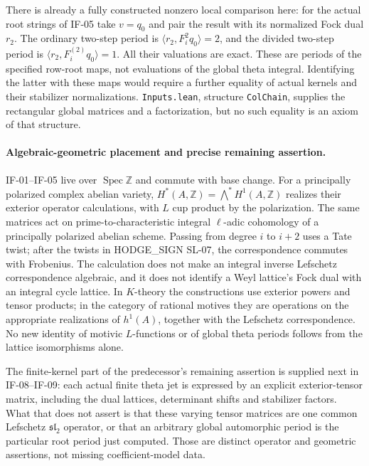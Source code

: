 \documentclass[11pt,a4paper]{article}
\theoremstyle{definition}
\theoremstyle{remark}
\begin{document}
There is already a fully constructed nonzero local comparison here:
for the actual root strings of IF-05 take $v=q_0$ and pair the result
with its normalized Fock dual $r_2$. The ordinary two-step period is
$\langle r_2,F_i^2q_0\rangle=2$, and the divided two-step period is
$\langle r_2,F_i^{(2)}q_0\rangle=1$. All their valuations are exact.
These are periods of the specified row-root maps, not evaluations of
the global theta integral. Identifying the latter with these maps
would require a further equality of actual kernels and their
stabilizer normalizations. \texttt{Inputs.lean}, structure
\texttt{ColChain}, supplies the rectangular global matrices and a
factorization, but no such equality is an axiom of that structure.

\paragraph{Algebraic-geometric placement and precise remaining assertion.}
IF-01--IF-05 live over $\operatorname{Spec}\mathbb Z$ and commute with
base change. For a principally polarized complex abelian variety,
$H^*(A,\mathbb Z)=\bigwedge^*H^1(A,\mathbb Z)$ realizes their exterior
operator calculations, with $L$ cup product by the polarization.
The same matrices act on prime-to-characteristic integral
$\ell$-adic cohomology of a principally polarized abelian scheme.
Passing from degree $i$ to $i+2$ uses a Tate twist; after the twists in
HODGE\_SIGN SL-07, the correspondence commutes with Frobenius. The
calculation does not make an integral inverse Lefschetz correspondence
algebraic, and it does not identify a Weyl lattice's Fock dual with an
integral cycle lattice. In $K$-theory the constructions use exterior
powers and tensor products; in the category of rational motives they
are operations on the appropriate realizations of $h^1(A)$, together
with the Lefschetz correspondence. No new identity of motivic
$L$-functions or of global theta periods follows from the lattice
isomorphisms alone.

The finite-kernel part of the predecessor's remaining assertion is
supplied next in IF-08--IF-09: each actual finite theta jet is expressed
by an explicit exterior-tensor matrix, including the dual lattices,
determinant shifts and stabilizer factors. What that does not assert
is that these varying tensor matrices are one common Lefschetz
$\mathfrak{sl}_2$ operator, or that an arbitrary global automorphic
period is the particular root period just computed. Those are distinct
operator and geometric assertions, not missing coefficient-model data.
\end{document}
